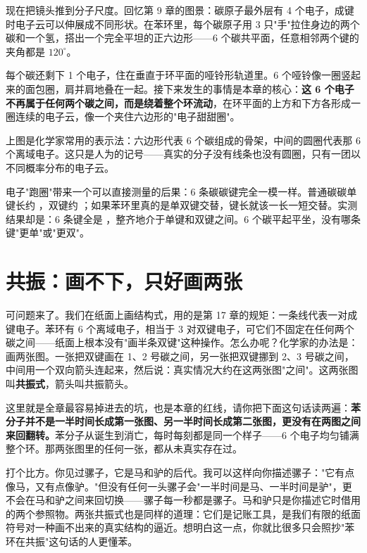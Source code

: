 现在把镜头推到分子尺度。回忆第 9 章的图景：碳原子最外层有 4 个电子，成键时电子云可以伸展成不同形状。在苯环里，每个碳原子用 3 只"手"拉住身边的两个碳和一个氢，搭出一个完全平坦的正六边形——6 个碳共平面，任意相邻两个键的夹角都是 $120^{\circ}$。

每个碳还剩下 1 个电子，住在垂直于环平面的哑铃形轨道里。6 个哑铃像一圈竖起来的面包圈，肩并肩地叠在一起。接下来发生的事情是本章的核心：\textbf{这 6 个电子不再属于任何两个碳之间，而是绕着整个环流动}，在环平面的上方和下方各形成一圈连续的电子云，像一个夹住六边形的"电子甜甜圈"。

\begin{center}
\end{center}

上图是化学家常用的表示法：六边形代表 6 个碳组成的骨架，中间的圆圈代表那 6 个离域电子。这只是人为的记号——真实的分子没有线条也没有圆圈，只有一团以不同概率分布的电子云。

电子"跑圈"带来一个可以直接测量的后果：6 条碳碳键完全一模一样。普通碳碳单键长约 ，双键约 ；如果苯环里真的是单双键交替，键长就该一长一短交替。实测结果却是：6 条键全是 ，整齐地介于单键和双键之间。6 个碳平起平坐，没有哪条键"更单"或"更双"。

\section{共振：画不下，只好画两张}

可问题来了。我们在纸面上画结构式，用的是第 17 章的规矩：一条线代表一对成键电子。苯环有 6 个离域电子，相当于 3 对双键电子，可它们不固定在任何两个碳之间——纸面上根本没有"画半条双键"这种操作。怎么办呢？化学家的办法是：画两张图。一张把双键画在 1、2 号碳之间，另一张把双键挪到 2、3 号碳之间，中间用一个双向箭头连起来，然后说：真实情况大约在这两张图"之间"。这两张图叫\textbf{共振式}，箭头叫共振箭头。

这里就是全章最容易掉进去的坑，也是本章的红线，请你把下面这句话读两遍：\textbf{苯分子并不是一半时间长成第一张图、另一半时间长成第二张图，更没有在两图之间来回翻转。}苯分子从诞生到消亡，每时每刻都是同一个样子——6 个电子均匀铺满整个环。那两张图里的任何一张，都从未真实存在过。

打个比方。你见过骡子，它是马和驴的后代。我可以这样向你描述骡子："它有点像马，又有点像驴。"但没有任何一头骡子会"一半时间是马、一半时间是驴"，更不会在马和驴之间来回切换——骡子每一秒都是骡子。马和驴只是你描述它时借用的两个参照物。两张共振式也是同样的道理：它们是记账工具，是我们有限的纸面符号对一种画不出来的真实结构的逼近。想明白这一点，你就比很多只会照抄"苯环在共振"这句话的人更懂苯。

